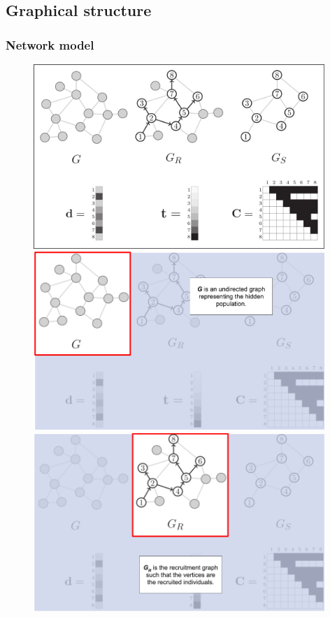 \documentclass{beamer}
\begin{document}
\subsection{Graphical structure}

\begin{frame}
  \frametitle{Network model}

  \begin{figure}
    \begin{overprint}
    \includegraphics[width=0.98\textwidth]{../../images/graphical-model-example-1.png}
    \includegraphics[width=0.98\textwidth]{../../images/graphical-model-example-2.png}
    \includegraphics[width=0.98\textwidth]{../../images/graphical-model-example-3.png}

\end{overprint}
\end{figure}
\end{frame}
\end{document}
